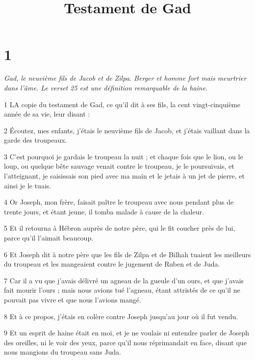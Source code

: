 

\title{Testament de Gad}

\chapter{1}

\par \textit{Gad, le neuvième fils de Jacob et de Zilpa. Berger et homme fort mais meurtrier dans l’âme. Le verset 25 est une définition remarquable de la haine.}

\par 1 LA copie du testament de Gad, ce qu'il dit à ses fils, la cent vingt-cinquième année de sa vie, leur disant :

\par 2 Écoutez, mes enfants, j'étais le neuvième fils de Jacob, et j'étais vaillant dans la garde des troupeaux.

\par 3 C'est pourquoi je gardais le troupeau la nuit ; et chaque fois que le lion, ou le loup, ou quelque bête sauvage venait contre le troupeau, je le poursuivais, et l'atteignant, je saisissais son pied avec ma main et le jetais à un jet de pierre, et ainsi je le tuais.

\par 4 Or Joseph, mon frère, faisait paître le troupeau avec nous pendant plus de trente jours, et étant jeune, il tomba malade à cause de la chaleur.

\par 5 Et il retourna à Hébron auprès de notre père, qui le fit coucher près de lui, parce qu'il l'aimait beaucoup.

\par 6 Et Joseph dit à notre père que les fils de Zilpa et de Bilhah tuaient les meilleurs du troupeau et les mangeaient contre le jugement de Ruben et de Juda.

\par 7 Car il a vu que j'avais délivré un agneau de la gueule d'un ours, et que j'avais fait mourir l'ours ; mais nous avions tué l'agneau, étant attristés de ce qu'il ne pouvait pas vivre et que nous l'avions mangé.

\par 8 Et à ce propos, j'étais en colère contre Joseph jusqu'au jour où il fut vendu.

\par 9 Et un esprit de haine était en moi, et je ne voulais ni entendre parler de Joseph des oreilles, ni le voir des yeux, parce qu'il nous réprimandait en face, disant que nous mangions du troupeau sans Juda.

